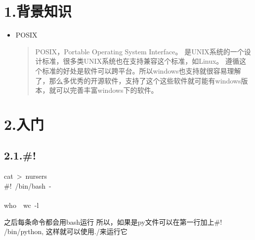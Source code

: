 \documentclass{article}
\begin{document}
\mdxtitleblockstart{}
\mdxauthorstart{}
\mdxauthorend\mdtitleauthorrunning{}{}\mdxtitleblockend%

\section{1.\hspace*{0.5em}背景知识}\label{section}%

\begin{itemize}[noitemsep,topsep=\mdcompacttopsep]%

\item{}POSIX

\begin{quote}%
POSIX，Portable Operating System Interface。\mdbr
{}是UNIX系统的一个设计标准，很多类UNIX系统也在支持兼容这个标准，如Linux。\mdbr
{}遵循这个标准的好处是软件可以跨平台。所以windows也支持就很容易理解了，那么多优秀的开源软件，支持了这个这些软件就可能有windows版本，就可以完善丰富windows下的软件。
\end{quote}%
\end{itemize}%

\section{2.\hspace*{0.5em}入门}\label{section}%

\subsection{2.1.\hspace*{0.5em}\#!}\label{section}%
\begin{mdpre}%
\noindent{}cat~\textgreater{}~nursers\\
\#!~/bin/bash~-\\
\\
who~\textbar{}~wc~-l%
\end{mdpre}\noindent{}之后每条命令都会用bash运行
所以，如果是py文件可以在第一行加上\#! /bin/python, 这样就可以使用./来运行它
\end{document}
